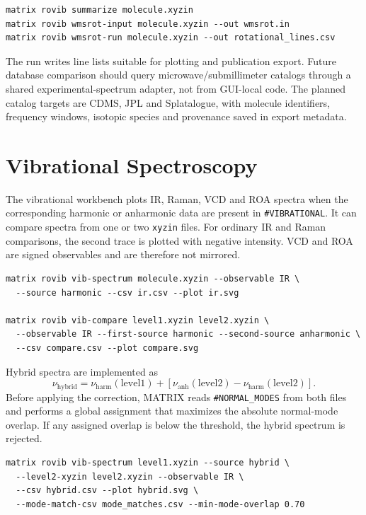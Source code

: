 \documentclass[11pt]{article}
\newcommand{\xyzin}{\texttt{xyzin}}
\newcommand{\sectionname}[1]{\texttt{\##1}}
\begin{document}
\begin{lstlisting}[style=matrix]
matrix rovib summarize molecule.xyzin
matrix rovib wmsrot-input molecule.xyzin --out wmsrot.in
matrix rovib wmsrot-run molecule.xyzin --out rotational_lines.csv
\end{lstlisting}

The run writes line lists suitable for plotting and publication export.  Future
database comparison should query microwave/submillimeter catalogs through a
shared experimental-spectrum adapter, not from GUI-local code.  The planned
catalog targets are CDMS, JPL and Splatalogue, with molecule identifiers,
frequency windows, isotopic species and provenance saved in export metadata.

\section{Vibrational Spectroscopy}

The vibrational workbench plots IR, Raman, VCD and ROA spectra when the
corresponding harmonic or anharmonic data are present in
\sectionname{VIBRATIONAL}.  It can compare spectra from one or two \xyzin{}
files.  For ordinary IR and Raman comparisons, the second trace is plotted with
negative intensity.  VCD and ROA are signed observables and are therefore not
mirrored.

\begin{lstlisting}[style=matrix]
matrix rovib vib-spectrum molecule.xyzin --observable IR \
  --source harmonic --csv ir.csv --plot ir.svg

matrix rovib vib-compare level1.xyzin level2.xyzin \
  --observable IR --first-source harmonic --second-source anharmonic \
  --csv compare.csv --plot compare.svg
\end{lstlisting}

Hybrid spectra are implemented as
\[
  \nu_\mathrm{hybrid}
  =
  \nu_\mathrm{harm}(\mathrm{level1})
  +
  \left[
    \nu_\mathrm{anh}(\mathrm{level2})
    -
    \nu_\mathrm{harm}(\mathrm{level2})
  \right].
\]
Before applying the correction, MATRIX reads \sectionname{NORMAL\_MODES} from
both files and performs a global assignment that maximizes the absolute
normal-mode overlap.  If any assigned overlap is below the threshold, the
hybrid spectrum is rejected.

\begin{lstlisting}[style=matrix]
matrix rovib vib-spectrum level1.xyzin --source hybrid \
  --level2-xyzin level2.xyzin --observable IR \
  --csv hybrid.csv --plot hybrid.svg \
  --mode-match-csv mode_matches.csv --min-mode-overlap 0.70
\end{lstlisting}
\end{document}
